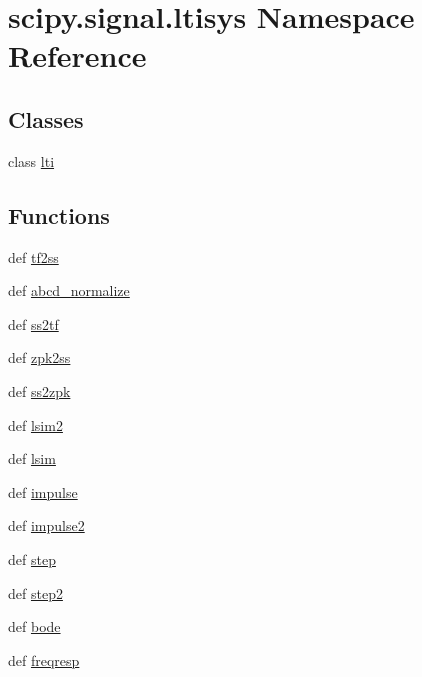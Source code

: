\hypertarget{namespacescipy_1_1signal_1_1ltisys}{}\section{scipy.\+signal.\+ltisys Namespace Reference}
\label{namespacescipy_1_1signal_1_1ltisys}
\subsection*{Classes}
\begin{DoxyCompactItemize}
\item 
class \hyperlink{classscipy_1_1signal_1_1ltisys_1_1lti}{lti}
\end{DoxyCompactItemize}
\subsection*{Functions}
\begin{DoxyCompactItemize}
\item 
def \hyperlink{namespacescipy_1_1signal_1_1ltisys_a6327b64c5fa8945c25546d161d33de48}{tf2ss}
\item 
def \hyperlink{namespacescipy_1_1signal_1_1ltisys_ab3413715b7b1409c9099a0033cc1ac2f}{abcd\+\_\+normalize}
\item 
def \hyperlink{namespacescipy_1_1signal_1_1ltisys_a30be5e88c78cc3f0bff961a849e31ec6}{ss2tf}
\item 
def \hyperlink{namespacescipy_1_1signal_1_1ltisys_a9e76fff225dd3a0fb382035f204ddee2}{zpk2ss}
\item 
def \hyperlink{namespacescipy_1_1signal_1_1ltisys_a27359ccaead3107af63ab06b5f505789}{ss2zpk}
\item 
def \hyperlink{namespacescipy_1_1signal_1_1ltisys_a446187c7665d3dd346390c2224a2470e}{lsim2}
\item 
def \hyperlink{namespacescipy_1_1signal_1_1ltisys_a5617028330ac7aa7b08c775a6e25f24f}{lsim}
\item 
def \hyperlink{namespacescipy_1_1signal_1_1ltisys_afa12868e1501b9259b2d31bd68f0c047}{impulse}
\item 
def \hyperlink{namespacescipy_1_1signal_1_1ltisys_a5c7a1b00f308205fcdacd2def77fdab9}{impulse2}
\item 
def \hyperlink{namespacescipy_1_1signal_1_1ltisys_ab267d47edfdcdeb7beac79ddeefa1365}{step}
\item 
def \hyperlink{namespacescipy_1_1signal_1_1ltisys_af948bb055bee6873ec5ef6328b8c715f}{step2}
\item 
def \hyperlink{namespacescipy_1_1signal_1_1ltisys_a82f9bc0359f142d4bd7d6b846bfdcb40}{bode}
\item 
def \hyperlink{namespacescipy_1_1signal_1_1ltisys_ac9e60072137080411f1ef74457689e6e}{freqresp}
\end{DoxyCompactItemize}
